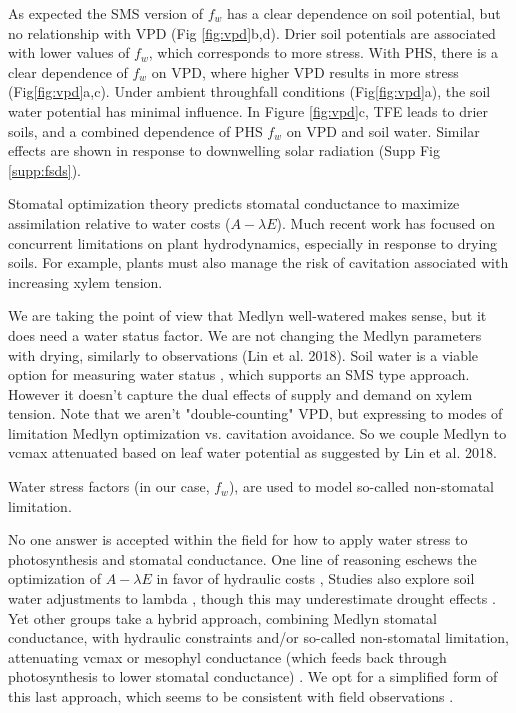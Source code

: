 \documentclass[draft,linenumbers]{agujournal}
\begin{document}
As expected the SMS version of $f_w$ has a clear dependence on soil potential, but no relationship with VPD (Fig \ref{fig:vpd}b,d). 
Drier soil potentials are associated with lower values of $f_w$, which corresponds to more stress.
With PHS, there is a clear dependence of $f_w$ on VPD, where higher VPD results in more stress (Fig\ref{fig:vpd}a,c).
Under ambient throughfall conditions (Fig\ref{fig:vpd}a), the soil water potential has minimal influence.
In Figure \ref{fig:vpd}c, TFE leads to drier soils, and a combined dependence of PHS $f_w$ on VPD and soil water.
Similar effects are shown in response to downwelling solar radiation (Supp Fig \ref{supp:fsds}).


Stomatal optimization theory predicts stomatal conductance to maximize assimilation relative to water costs ($A-\lambda E$).
Much recent work has focused on concurrent limitations on plant hydrodynamics, especially in response to drying soils.
For example, plants must also manage the risk of cavitation associated with increasing xylem tension.

We are taking the point of view that Medlyn well-watered makes sense, but it does need a water status factor.
We are not changing the Medlyn parameters with drying, similarly to observations (Lin et al. 2018).
Soil water is a viable option for measuring water status \citep{drake2017}, which supports an SMS type approach.
However it doesn't capture the dual effects of supply and demand on xylem tension.
Note that we aren't "double-counting" VPD, but expressing to modes of limitation Medlyn optimization vs. cavitation avoidance.
So we couple Medlyn to vcmax attenuated based on leaf water potential as suggested by Lin et al. 2018.

Water stress factors (in our case, $f_w$), are used to model so-called non-stomatal limitation. 

No one answer is accepted within the field for how to apply water stress to photosynthesis and stomatal conductance.
One line of reasoning eschews the optimization of $A-\lambda E$ in favor of hydraulic costs \citep{sperry2017},
Studies also explore soil water adjustments to lambda \citep{manzoni2013b}, though this may underestimate drought effects \citep{zhou2013}.
Yet other groups take a hybrid approach, combining Medlyn stomatal conductance, with hydraulic constraints and/or 
so-called non-stomatal limitation, attenuating vcmax or mesophyl conductance
(which feeds back through photosynthesis to lower stomatal conductance) \citep{egea2011,novick2016a}.
We opt for a simplified form of this last approach, which seems to be consistent with field observations \citep{lin2018}.
\end{document}
